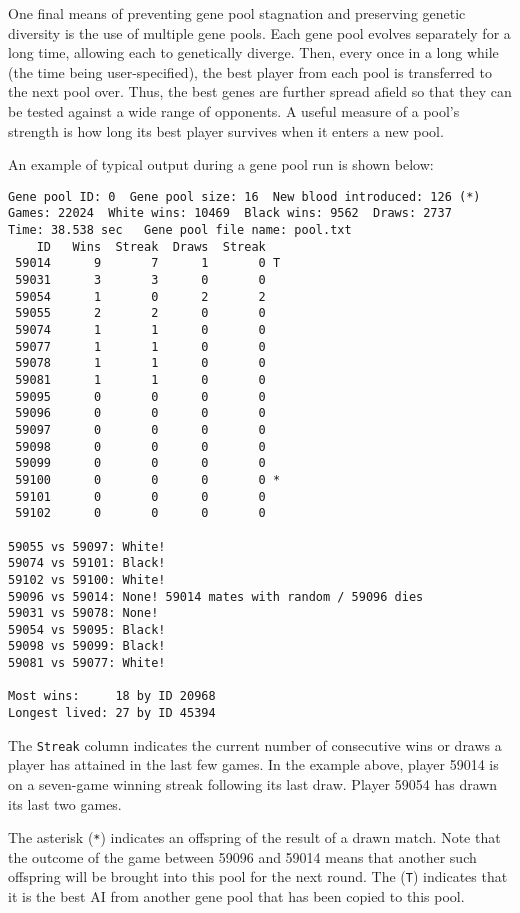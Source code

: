 \documentclass[letter]{article}
\renewcommand\_{\textunderscore\allowbreak}
\begin{document}
One final means of preventing gene pool stagnation and preserving genetic diversity is the use of multiple gene pools. Each gene pool evolves separately for a long time, allowing each to genetically diverge. Then, every once in a long while (the time being user-specified), the best player from each pool is transferred to the next pool over. Thus, the best genes are further spread afield so that they can be tested against a wide range of opponents. A useful measure of a pool's strength is how long its best player survives when it enters a new pool.

An example of typical output during a gene pool run is shown below:
\begin{verbatim}
Gene pool ID: 0  Gene pool size: 16  New blood introduced: 126 (*)
Games: 22024  White wins: 10469  Black wins: 9562  Draws: 2737
Time: 38.538 sec   Gene pool file name: pool.txt
    ID   Wins  Streak  Draws  Streak
 59014      9       7      1       0 T
 59031      3       3      0       0
 59054      1       0      2       2
 59055      2       2      0       0
 59074      1       1      0       0
 59077      1       1      0       0
 59078      1       1      0       0
 59081      1       1      0       0
 59095      0       0      0       0
 59096      0       0      0       0
 59097      0       0      0       0
 59098      0       0      0       0
 59099      0       0      0       0
 59100      0       0      0       0 *
 59101      0       0      0       0
 59102      0       0      0       0

59055 vs 59097: White!
59074 vs 59101: Black!
59102 vs 59100: White!
59096 vs 59014: None! 59014 mates with random / 59096 dies
59031 vs 59078: None!
59054 vs 59095: Black!
59098 vs 59099: Black!
59081 vs 59077: White!

Most wins:     18 by ID 20968
Longest lived: 27 by ID 45394

\end{verbatim}
The \verb|Streak| column indicates the current number of consecutive wins or draws a player has attained in the last few games. In the example above, player 59014 is on a seven-game winning streak following its last draw. Player 59054 has drawn its last two games.

The asterisk (\verb|*|) indicates an offspring of the result of a drawn match. Note that the outcome of the game between 59096 and 59014 means that another such offspring will be brought into this pool for the next round. The (\verb|T|) indicates that it is the best AI from another gene pool that has been copied to this pool.
\end{document}
